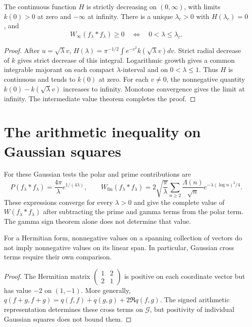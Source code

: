 \begin{theorem}
\label{v4-arith:w7-d:thm:gauss-ATP}
The continuous function $H$ is strictly decreasing on $(0,\infty)$,
with limits $k(0)>0$ at zero and $-\infty$ at infinity.
There is a unique $\lambda_c>0$ with $H(\lambda_c)=0$, and
\[
 W_\infty(f_\lambda*f_\lambda)\ge0
 \quad\Longleftrightarrow\quad 0<\lambda\le\lambda_c.
\]
\end{theorem}
\begin{proof}
After $u=\sqrt\lambda v$,
$H(\lambda)=\pi^{-1/2}\int e^{-v^2}k(\sqrt\lambda v)dv$.
Strict radial decrease of $k$ gives strict decrease of this integral.
Logarithmic growth gives a common integrable majorant on each compact
$\lambda$-interval and on $0<\lambda\le1$.
Thus $H$ is continuous and tends to $k(0)$ at zero.
For each $v\ne0$, the nonnegative quantity
$k(0)-k(\sqrt\lambda v)$ increases to infinity.
Monotone convergence gives the limit at infinity.
The intermediate value theorem completes the proof.
\end{proof}

\section{The arithmetic inequality on Gaussian squares}
For these Gaussian tests the polar and prime contributions are
\[
 P(f_\lambda*f_\lambda)=\frac{4\pi}{\lambda}e^{1/(4\lambda)},
 \qquad
 W_{\mathrm{fin}}(f_\lambda*f_\lambda)
 =2\sqrt{\frac\pi\lambda}\sum_{n\ge2}
   \frac{\Lambda(n)}{\sqrt n}e^{-\lambda(\log n)^2/4}.
\]
These expressions converge for every $\lambda>0$ and give the
complete value of $W(f_\lambda*f_\lambda)$ after subtracting the
prime and gamma terms from the polar term.
The gamma sign theorem alone does not determine that value.

\begin{proposition}
For a Hermitian form, nonnegative values on a spanning collection
of vectors do not imply nonnegative values on its linear span.
In particular, Gaussian cross terms require their own comparison.
\end{proposition}
\begin{proof}
The Hermitian matrix
$\left(\begin{smallmatrix}1&2\\2&1\end{smallmatrix}\right)$
is positive on each coordinate vector but has value $-2$ on $(1,-1)$.
More generally, $q(f+g,f+g)=q(f,f)+q(g,g)+2\Re q(f,g)$.
The signed arithmetic representation determines these cross terms
on $\mathscr G$, but positivity of individual Gaussian squares
does not bound them.
\end{proof}


